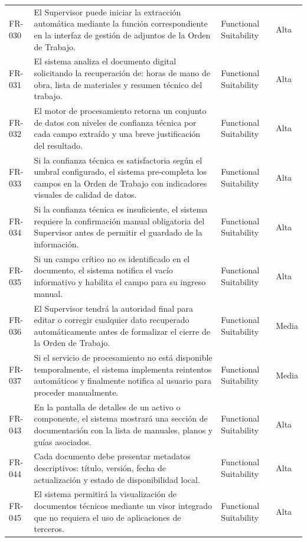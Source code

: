 \begin{longtable}{>{\raggedright\arraybackslash}p{} >{\raggedright\arraybackslash}p{} >{\raggedright\arraybackslash}p{} >{\raggedright\arraybackslash}p{}}
FR-030 & El Supervisor puede iniciar la extracción automática mediante la función correspondiente en la interfaz de gestión de adjuntos de la Orden de Trabajo. & Functional Suitability & Alta \\
FR-031 & El sistema analiza el documento digital solicitando la recuperación de: horas de mano de obra, lista de materiales y resumen técnico del trabajo. & Functional Suitability & Alta \\
FR-032 & El motor de procesamiento retorna un conjunto de datos con niveles de confianza técnica por cada campo extraído y una breve justificación del resultado. & Functional Suitability & Alta \\
FR-033 & Si la confianza técnica es satisfactoria según el umbral configurado, el sistema pre-completa los campos en la Orden de Trabajo con indicadores visuales de calidad de datos. & Functional Suitability & Alta \\
FR-034 & Si la confianza técnica es insuficiente, el sistema requiere la confirmación manual obligatoria del Supervisor antes de permitir el guardado de la información. & Functional Suitability & Alta \\
FR-035 & Si un campo crítico no es identificado en el documento, el sistema notifica el vacío informativo y habilita el campo para su ingreso manual. & Functional Suitability & Alta \\
FR-036 & El Supervisor tendrá la autoridad final para editar o corregir cualquier dato recuperado automáticamente antes de formalizar el cierre de la Orden de Trabajo. & Functional Suitability & Media \\
FR-037 & Si el servicio de procesamiento no está disponible temporalmente, el sistema implementa reintentos automáticos y finalmente notifica al usuario para proceder manualmente. & Functional Suitability & Media \\
FR-043 & En la pantalla de detalles de un activo o componente, el sistema mostrará una sección de documentación con la lista de manuales, planos y guías asociados. & Functional Suitability & Alta \\
FR-044 & Cada documento debe presentar metadatos descriptivos: título, versión, fecha de actualización y estado de disponibilidad local. & Functional Suitability & Alta \\
FR-045 & El sistema permitirá la visualización de documentos técnicos mediante un visor integrado que no requiera el uso de aplicaciones de terceros. & Functional Suitability & Alta \\

\end{longtable}
